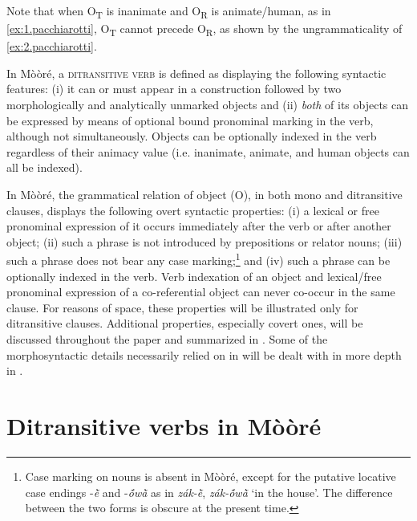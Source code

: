 \documentclass[output=paper]{langsci/langscibook}
\begin{document}
Note that when O\textsubscript{T} is inanimate and O\textsubscript{R} is animate/human, as in \ref{ex:1.pacchiarotti}, O\textsubscript{T} cannot precede O\textsubscript{R}, as shown by the ungrammaticality of \ref{ex:2.pacchiarotti}.

\z

In M\`{o}\`{o}r\'{e}, a \textsc{ditransitive verb} is defined as displaying the following syntactic features: (i) it can or must appear in a construction followed by two morphologically and analytically unmarked objects and (ii) \textit{both} of its objects can be expressed by means of optional bound pronominal marking in the verb, although not simultaneously. Objects can be optionally indexed in the verb regardless of their animacy value (i.e. inanimate, animate, and human objects can all be indexed).

In M\`{o}\`{o}r\'{e}, the grammatical relation of object (O), in both mono and ditransitive clauses, displays the following overt syntactic properties: (i) a lexical or free pronominal expression of it occurs immediately after the verb or after another object; (ii) such a phrase is not introduced by prepositions or relator nouns; (iii) such a phrase does not bear any case marking;\footnote{Case marking on nouns is absent in M\`{o}\`{o}r\'{e}, except for the putative locative case endings -\textit{\`{\~{e}} }and -\textit{\'{\~{o}}w\`{\~{a}}} as in \textit{z\'{a}k-\`{\~{e}}}, \textit{z\'{a}k-\'{\~{o}}w\`{\~{a}}} `in the house'. The difference between the two forms is obscure at the present time.} and (iv) such a phrase can be optionally indexed in the verb. Verb indexation of an object and lexical/free pronominal expression of a co-referential object can never co-occur in the same clause. For reasons of space, these properties will be illustrated only for ditransitive clauses. Additional properties, especially covert ones, will be discussed throughout the paper and summarized in . Some of the morphosyntactic details necessarily relied on in   will be dealt with in more depth in .

\section{Ditransitive verbs in M\`{o}\`{o}r\'{e}}\label{§3:ditransitive.pacchiarotti}
\end{document}
